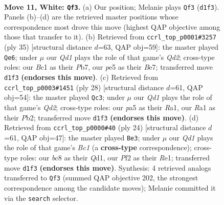 \documentclass[11pt]{article}
\begin{document}
\clearpage

\begin{figure}[p]\centering
\begin{subfigure}{0.46\textwidth}\centering
\resizebox{\linewidth}{!}{%
\newchessgame
\chessboard[
  setfen={r1bq1rk1/2p2pp1/2pp1n2/p3p1Np/4P3/2PP2P1/P1P2P1P/R1BQ1RK1 w - - 0 11},
  showmover=false,
  pgfstyle=straightmove, color=movearrow, markmove={d1-f3}
]}
\caption{}
\end{subfigure}\hfill
\begin{subfigure}{0.46\textwidth}\centering
\resizebox{\linewidth}{!}{%
\newchessgame
\chessboard[
  setfen={r3r1k1/1p1qbpp1/p2p1n1p/4p3/PPP5/3PBN1P/4QPP1/R2R2K1 b - - 0 18},
  showmover=false,
  pgfstyle=straightmove, color=movearrow, markmove={d7-e6}
]}
\caption{}
\end{subfigure}
\\[4pt]
\begin{subfigure}{0.46\textwidth}\centering
\resizebox{\linewidth}{!}{%
\newchessgame
\chessboard[
  setfen={r2q1rk1/2p3pp/1p1ppn2/p3p3/P3P3/3PPN1P/1PPQ2P1/R4RK1 w - - 0 15},
  showmover=false,
  pgfstyle=straightmove, color=movearrow, markmove={d2-c3}
]}
\caption{}
\end{subfigure}\hfill
\begin{subfigure}{0.46\textwidth}\centering
\resizebox{\linewidth}{!}{%
\newchessgame
\chessboard[
  setfen={1rb2rk1/p1p1qpp1/3p1n1p/P1p1p3/4P3/2PP1N1P/2P2PP1/R1BQR1K1 w - - 2 13},
  showmover=false,
  pgfstyle=straightmove, color=movearrow, markmove={c1-e3}
]}
\caption{}
\end{subfigure}
\caption{\textbf{Move 11, White: \texttt{Qf3}.} (a) Our position; Melanie plays \texttt{Qf3} (\texttt{d1f3}). Panels (b)--(d) are the retrieved master positions whose correspondence most drove this move (highest QAP objective among those that transfer to it). (b) Retrieved from \texttt{ccrl\_top\_p0001\#3257} (ply 35) [structural distance $d$=63, QAP obj=59]: the master played \texttt{Qe6}; under $\mu$ our \emph{Qd1} plays the role of that game's \emph{Qd2}; cross-type roles: our \emph{B}c1 as their \emph{P}b7, our \emph{p}e5 as their \emph{B}e7; transferred move \texttt{d1f3} \textbf{(endorses this move)}. (c) Retrieved from \texttt{ccrl\_top\_p0003\#1451} (ply 28) [structural distance $d$=61, QAP obj=54]: the master played \texttt{Qc3}; under $\mu$ our \emph{Qd1} plays the role of that game's \emph{Qd2}; cross-type roles: our \emph{p}a5 as their \emph{R}a1, our \emph{R}a1 as their \emph{P}b2; transferred move \texttt{d1f3} \textbf{(endorses this move)}. (d) Retrieved from \texttt{ccrl\_top\_p0000\#40} (ply 24) [structural distance $d$=61, QAP obj=47]: the master played \texttt{Be3}; under $\mu$ our \emph{Qd1} plays the role of that game's \emph{Bc1} (a \textbf{cross-type} correspondence); cross-type roles: our \emph{b}c8 as their \emph{Q}d1, our \emph{P}f2 as their \emph{R}e1; transferred move \texttt{d1f3} \textbf{(endorses this move)}. Synthesis: 4 retrieved analogs transferred to \texttt{Qf3} (summed QAP objective 202, the strongest correspondence among the candidate moves); Melanie committed it via the \texttt{search} selector.}
\label{fig:thought-m20}
\end{figure}
\end{document}
